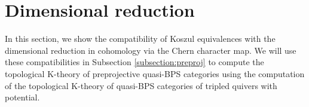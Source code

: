 \documentclass [11pt,oneside,a4paper,mathscr]{amsart}
\newtheorem{cor}[thm]{Corollary}
\theoremstyle{definition}
\begin{document}
\section{Dimensional reduction}\label{s5}
In this section, we show the compatibility 
of Koszul equivalences with
the dimensional reduction in cohomology via the Chern character map.  
We will use these compatibilities in Subsection \ref{subsection:preproj} to compute the topological K-theory of preprojective quasi-BPS categories using the computation of the topological K-theory of quasi-BPS categories of tripled quivers with potential.






















\end{document}
